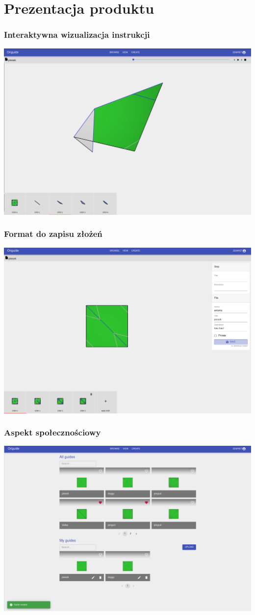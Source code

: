 \documentclass{beamer}
\begin{document}
\section{Prezentacja produktu}
\begin{frame}
  \frametitle{Interaktywna wizualizacja instrukcji}
  \includegraphics[width=\linewidth]{assets/5-folderView.png}
\end{frame}
\begin{frame}
  \frametitle{Format do zapisu złożeń}
  \includegraphics[width=\linewidth]{assets/5-designerSave.png}
\end{frame}
\begin{frame}
  \frametitle{Aspekt społecznościowy}
  \includegraphics[width=\linewidth]{assets/5-designerBrowser.png}
\end{frame}
\end{document}
